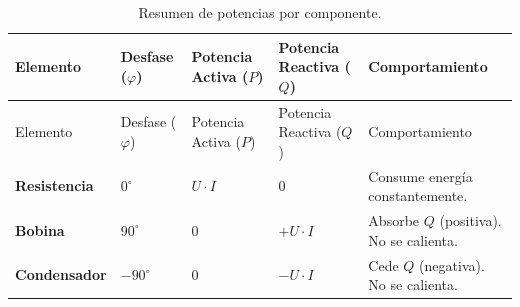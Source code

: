 \documentclass[
  a4paper,
  DIV=11,
  numbers=noendperiod]{scrreprt}
\begin{document}
\begin{longtable}[]{@{}
  >{\raggedright\arraybackslash}p{}
  >{\centering\arraybackslash}p{}
  >{\centering\arraybackslash}p{}
  >{\centering\arraybackslash}p{}
  >{\raggedright\arraybackslash}p{}@{}}
\caption{Resumen de potencias por
componente.}\label{tbl-potencias-componentes}\tabularnewline
\toprule\noalign{}
\begin{minipage}[b]{\linewidth}\raggedright
Elemento
\end{minipage} & \begin{minipage}[b]{\linewidth}\centering
Desfase (\(\varphi\))
\end{minipage} & \begin{minipage}[b]{\linewidth}\centering
Potencia Activa (\(P\))
\end{minipage} & \begin{minipage}[b]{\linewidth}\centering
Potencia Reactiva (\(Q\))
\end{minipage} & \begin{minipage}[b]{\linewidth}\raggedright
Comportamiento
\end{minipage} \\
\midrule\noalign{}
\endfirsthead
\toprule\noalign{}
\begin{minipage}[b]{\linewidth}\raggedright
Elemento
\end{minipage} & \begin{minipage}[b]{\linewidth}\centering
Desfase (\(\varphi\))
\end{minipage} & \begin{minipage}[b]{\linewidth}\centering
Potencia Activa (\(P\))
\end{minipage} & \begin{minipage}[b]{\linewidth}\centering
Potencia Reactiva (\(Q\))
\end{minipage} & \begin{minipage}[b]{\linewidth}\raggedright
Comportamiento
\end{minipage} \\
\midrule\noalign{}
\endhead
\bottomrule\noalign{}
\endlastfoot
\textbf{Resistencia} & \(0^\circ\) & \textbf{\(U \cdot I\)} & \(0\) &
Consume energía constantemente. \\
\textbf{Bobina} & \(90^\circ\) & \(0\) & \textbf{\(+ U \cdot I\)} &
Absorbe \(Q\) (positiva). No se calienta. \\
\textbf{Condensador} & \(-90^\circ\) & \(0\) & \textbf{\(- U \cdot I\)}
& Cede \(Q\) (negativa). No se calienta. \\
\end{longtable}
\end{document}
